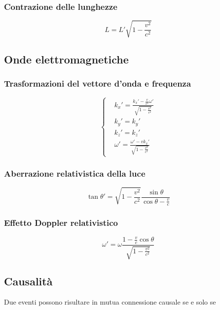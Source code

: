 \documentclass{article}
\begin{document}
\subsubsection{Contrazione delle lunghezze}

\begin{equation}
    L = L' \sqrt{1-\frac{v^2}{c^2}}
\end{equation}

\subsection{Onde elettromagnetiche}
\subsubsection{Trasformazioni del vettore d'onda e frequenza}
\begin{equation}
    \left\{
    \begin{aligned}
         & k_x'= \frac{k_x'-\frac{v}{c^2}\omega'}{\sqrt{1-\frac{v^2}{c^2}}} \\
         & k_y'= k_y'                                                       \\
         & k_z'= k_z'                                                       \\
         & \omega'= \frac{\omega'-vk_x'}{\sqrt{1-\frac{v^2}{c^2}}}
    \end{aligned}
    \right.
\end{equation}

\subsubsection{Aberrazione relativistica della luce}
\begin{equation}
    \tan \theta' = \sqrt{1-\frac{v^2}{c^2}}\frac{\sin \theta}{\cos \theta - \frac{v}{c}}
\end{equation}

\subsubsection{Effetto Doppler relativistico}

\begin{equation}
    \omega' = \omega\frac{1-\frac{v}{c}\cos{\theta}}{\sqrt{1-\frac{v^2}{c^2}}}
\end{equation}


\subsection{Causalità}
Due eventi possono risultare in mutua connessione causale se e solo se
\end{document}
